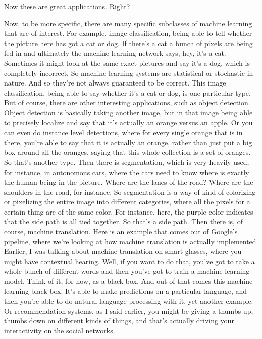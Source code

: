 Now these are great applications. Right?

Now, to be more specific, there are many specific subclasses of machine learning that are of interest.
For example, image classification, being able to tell whether the picture here has got a cat or dog.
If there's a cat a bunch of pixels are being fed in and ultimately the machine learning network says, hey, it's a cat.
Sometimes it might look at the same exact pictures and say it's a dog, which is completely incorrect.
So machine learning systems are statistical or stochastic in nature.
And so they're not always guaranteed to be correct.
This image classification, being able to say whether it's a cat or dog, is one particular type.
But of course, there are other interesting applications, such as object detection.
Object detection is basically taking another image, but in that image being able to precisely localize and say that it's actually an orange versus an apple.
Or you can even do instance level detections, where for every single orange that is in there, you're able to say that it is actually an orange, rather than just put a big box around all the oranges, saying that this whole collection is a set of oranges.
So that's another type.
Then there is segmentation, which is very heavily used, for instance, in autonomous cars, where the cars need to know where is exactly the human being in the picture.
Where are the lanes of the road?
Where are the shoulders in the road, for instance.
So segmentation is a way of kind of colorizing or pixelizing the entire image into different categories, where all the pixels for a certain thing are of the same color.
For instance, here, the purple color indicates that the side path is all tied together.
So that's a side path.
Then there is, of course, machine translation.
Here is an example that comes out of Google's pipeline, where we're looking at how machine translation is actually implemented.
Earlier, I was talking about machine translation on smart glasses, where you might have contextual hearing.
Well, if you want to do that, you've got to take a whole bunch of different words and then you've got to train a machine learning model.
Think of it, for now, as a black box.
And out of that comes this machine learning black box.
It's able to make predictions on a particular language, and then you're able to do natural language processing with it, yet another example.
Or recommendation systems, as I said earlier, you might be giving a thumbs up, thumbs down on different kinds of things, and that's actually driving your interactivity on the social networks.
